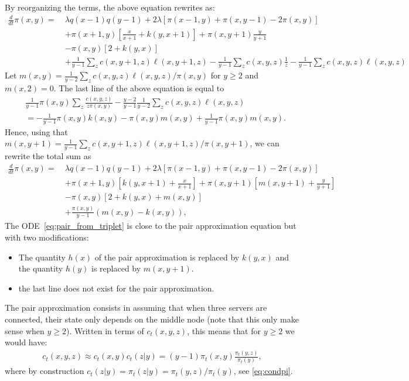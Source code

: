\documentclass[acmsmall,nonacm]{acmart}
\begin{document}
By reorganizing the terms, the above equation rewrites as:
\begin{align*}
    \frac{d}{dt} \pi(x,y) =~&
    \lambda q(x-1)q(y-1) + 2\lambda [\pi(x-1,y) +  \pi(x,y-1)-2 \pi(x,y)]  \nonumber \\
    &+ \pi(x+1,y)[\frac{x}{x+1} + k(y, x+1)] + \pi(x,y+1)\frac{y}{y+1} \\
    &-\pi(x,y) [2+k(y,x) ]\nonumber\\
    &+ \frac{1}{y-1} \sum_z c(x,y+1,z) \ell(x,y+1,z)- \frac{1}{y-1} \sum_z c(x,y,z)\frac{1}{z}  - \frac{1}{y-1} \sum_z c(x,y,z) \ell(x,y,z) 
\end{align*} 
Let $m(x,y)=\frac{1}{y-2} \sum_z c(x,y,z) \ell(x,y,z)/\pi(x,y)$ for $y\ge2$ and $m(x,2)=0$. The last line of the above equation is equal to \begin{align*}
    &\frac1{y-1}\pi(x,y)\sum_z \frac{c(x,y,z)}{z \pi(x,y)} - \frac{y-2}{y-1}\frac{1}{y-2}\sum_z c(x,y,z) \ell(x,y,z)\\
    &= -\frac1{y-1}\pi(x,y)k(x,y) - \pi(x,y)m(x,y) + \frac1{y-1}\pi(x,y)m(x,y).
\end{align*}
Hence, using that $m(x,y+1)=\frac{1}{y-1} \sum_z c(x,y+1,z) \ell(x,y+1,z)/\pi(x,y+1)$, we can rewrite the total sum as
\begin{align}
    \label{eq:pair_from_triplet}
    \frac{d}{dt} \pi(x,y) =~&
    \lambda q(x-1)q(y-1) + 2\lambda [\pi(x-1,y) + \pi(x,y-1)-2 \pi(x,y)]  \nonumber \\
    &+ \pi(x+1,y)\left[k(y, x+1) + \frac{x}{x+1}\right] + \pi(x,y+1)\left[m(x,y+1) + \frac{y}{y+1}\right] \nonumber\\
    &-\pi(x,y) [2+k(y,x) +m(x,y)]\nonumber\\
    &+ \frac{\pi(x,y)}{y-1}\left( m(x,y) - k(x,y)\right),
\end{align} 
The ODE~\eqref{eq:pair_from_triplet} is close to the pair approximation equation but with two modifications:
\begin{itemize}
    \item The quantity $h(x)$ of the pair approximation is replaced by $k(y,x)$ and the quantity $h(y)$ is replaced by $m(x,y+1)$.
    \item the last line does not exist for the pair approximation.
\end{itemize}
The pair approximation consists in assuming that when three servers are connected, their state only depends on the middle node (note that this only make sense when $y\ge2$).  Written in terms of $c_t(x,y,z)$, this means that for $y\ge2$ we would have:
\begin{align}
    \label{eq:PA}
    c_t(x,y,z) \approx c_t(x,y) c_t(z | y) = (y-1) \pi_t(x,y) \frac{\pi_t(y,z)}{\pi_t(y)},
\end{align}
where by construction $c_t(z|y) = \pi_t(z|y)= \pi_t(y,z)/\pi_t(y)$, see \eqref{eq:condpi}.
\end{document}
